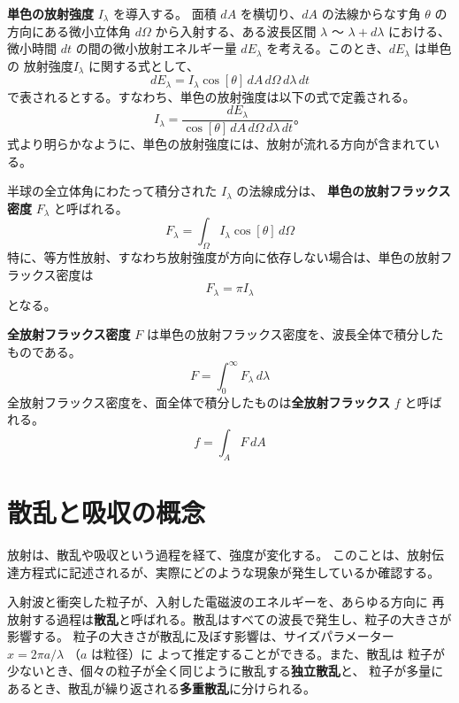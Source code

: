 \documentclass[article]{dennou777}
\newcommand{\hmemph}[1]{\textbf{#1}}
\begin{document}
\hmemph{単色の放射強度} $I_\lambda$ を導入する。
面積 $dA$ を横切り、$dA$ の法線からなす角 $\theta$ の方向にある微小立体角 $d\Omega$
から入射する、ある波長区間 $\lambda$ 〜 $\lambda+d\lambda$ における、微小時間 $dt$
の間の微小放射エネルギー量 $dE_\lambda$ を考える。このとき、$dE_\lambda$ は単色の
放射強度$I_\lambda$ に関する式として、
\begin{equation}
	dE_\lambda=I_\lambda\cos[\theta]\,dA\,d\Omega\,d\lambda\,dt
\end{equation}
で表されるとする。すなわち、単色の放射強度は以下の式で定義される。
\begin{equation}
	I_\lambda=\frac{dE_\lambda}{\cos[\theta]\,dA\,d\Omega\,d\lambda\,dt}。
\end{equation}
式より明らかなように、単色の放射強度には、放射が流れる方向が含まれている。

半球の全立体角にわたって積分された $I_\lambda$ の法線成分は、
\hmemph{単色の放射フラックス密度} $F_\lambda$ と呼ばれる。
\begin{equation}
	F_\lambda=\int_\Omega I_\lambda\cos[\theta]\,d\Omega
\end{equation}
特に、等方性放射、すなわち放射強度が方向に依存しない場合は、単色の放射フラックス密度は
\begin{equation}
	F_\lambda=\pi I_\lambda
\end{equation}
となる。

\hmemph{全放射フラックス密度} $F$ は単色の放射フラックス密度を、波長全体で積分したものである。
\begin{equation}
	F=\int^\infty_0 F_\lambda\,d\lambda
\end{equation}
全放射フラックス密度を、面全体で積分したものは\hmemph{全放射フラックス} $f$ と呼ばれる。
\begin{equation}
	f=\int_AF\,dA
\end{equation}

\section{散乱と吸収の概念}

放射は、散乱や吸収という過程を経て、強度が変化する。
このことは、放射伝達方程式に記述されるが、実際にどのような現象が発生しているか確認する。

入射波と衝突した粒子が、入射した電磁波のエネルギーを、あらゆる方向に
再放射する過程は\hmemph{散乱}と呼ばれる。散乱はすべての波長で発生し、粒子の大きさが影響する。
粒子の大きさが散乱に及ぼす影響は、サイズパラメーター $x=2\pi a/\lambda$ （$a$ は粒径）に
よって推定することができる。また、散乱は
粒子が少ないとき、個々の粒子が全く同じように散乱する\hmemph{独立散乱}と、
粒子が多量にあるとき、散乱が繰り返される\hmemph{多重散乱}に分けられる。
\end{document}
